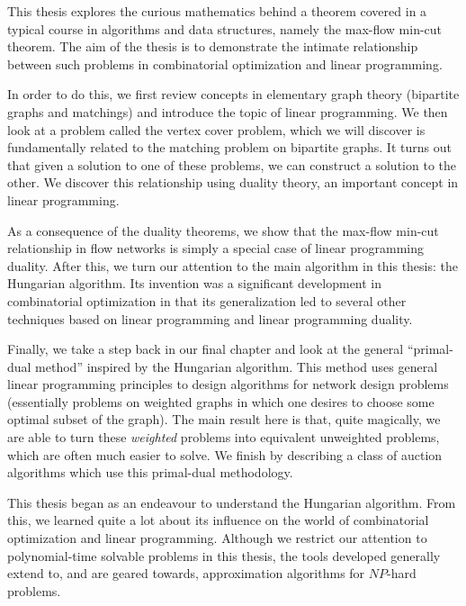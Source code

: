 This thesis explores the curious mathematics behind a theorem covered in a typical course in 
algorithms and data structures, namely the max-flow min-cut theorem. The aim of the thesis is to 
demonstrate the intimate relationship between such problems in combinatorial optimization and linear 
programming.

In order to do this, we first 
review concepts in elementary graph theory (bipartite graphs and matchings) and introduce the topic 
of linear programming. We then look at a problem called the vertex cover problem, which we will discover 
is fundamentally related to the matching problem on bipartite graphs. It turns out that given a solution 
to one of these problems, we can construct a solution to the other. We discover this relationship 
using duality theory, an important concept in linear programming. 

As a consequence of the duality 
theorems, we show that the max-flow min-cut relationship in flow networks is simply a special case of 
linear programming duality. After this, we turn our attention to the main algorithm in this thesis:
the Hungarian algorithm. Its invention was a significant development in combinatorial optimization 
in that its generalization led to several other techniques based on linear programming and linear 
programming duality. 

Finally, we take a step back in our final chapter and look at the general 
``primal-dual method'' inspired by the Hungarian algorithm. This method uses general linear programming 
principles to design algorithms for network design problems (essentially problems on weighted graphs in 
which one desires to choose some optimal subset of the graph). The main result here is that, quite 
magically, we are able to turn these \emph{weighted} problems into equivalent unweighted problems, which 
are often much easier to solve. We finish by describing a class of auction algorithms which use this 
primal-dual methodology.

This thesis began as an endeavour to understand the Hungarian algorithm. From this, we learned 
quite a lot about its influence on the world of combinatorial optimization and linear programming. 
Although we restrict our attention to polynomial-time solvable problems in this thesis, the tools 
developed generally extend to, and are geared towards, approximation algorithms for $NP$-hard 
problems. 
